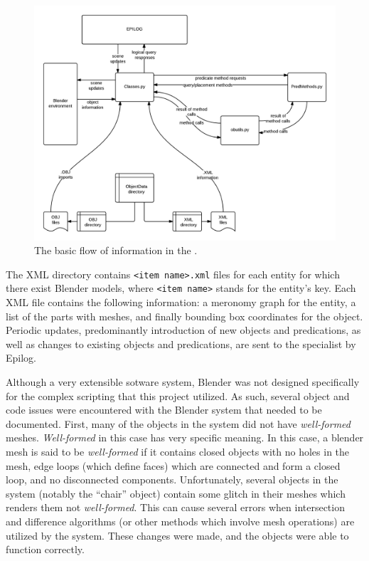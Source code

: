 \begin{figure}[h]
	\begin{center}
		\includegraphics[width=1\textwidth]{figures/mirs_flow.png}
		\caption{The basic flow of information in the \TDS.}
		\label{fig:mirs_flow}
	\end{center}
\end{figure}

The XML directory contains \texttt{\textless item name\textgreater.xml} files for each entity for which there exist Blender models, where \texttt{\textless item name\textgreater} \xspace stands for the entity's key. Each XML file contains the following information: a meronomy graph for the entity, a list of the parts with meshes, and finally bounding box coordinates for the object. 
Periodic updates, predominantly introduction of new objects and predications, as well as changes to existing objects and predications, are sent to the specialist by Epilog.

Although a very extensible sotware system, Blender was not designed specifically for the complex scripting that this project utilized. As such, several object and code issues were encountered with the Blender system that needed to be documented.
First, many of the objects in the system did not have \emph{well-formed} meshes. 
\emph{Well-formed} in this case has very specific meaning. 
In this case, a blender mesh is said to be \emph{well-formed} if it contains closed objects with no holes in the mesh, edge loops (which define faces) which are connected and form a closed loop, and no disconnected components. 
Unfortunately, several objects in the system (notably the “chair” object) contain some glitch in their meshes which renders them not \emph{well-formed}. 
This can cause several errors when intersection and difference algorithms (or other methods which involve mesh operations) are utilized by the system.
These changes were made, and the objects were able to function correctly.

